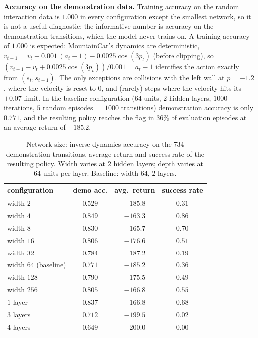 \documentclass[12pt]{article}%
\begin{document}
\medskip
\noindent\textbf{Accuracy on the demonstration data.} Training accuracy on the random
interaction data is $1.000$ in every configuration except the smallest network, so it is not
a useful diagnostic; the informative number is accuracy on the demonstration transitions,
which the model never trains on. A training accuracy of $1.000$ is expected: MountainCar's
dynamics are deterministic, $v_{t+1} = v_t + 0.001\,(a_t - 1) - 0.0025\cos(3p_t)$ (before
clipping), so $(v_{t+1} - v_t + 0.0025\cos(3p_t))/0.001 = a_t - 1$ identifies the action
exactly from $(s_t, s_{t+1})$. The only exceptions are collisions with the left wall at
$p=-1.2$, where the velocity is reset to $0$, and (rarely) steps where the velocity hits its
$\pm 0.07$ limit. In the baseline configuration ($64$ units, $2$ hidden
layers, $1000$ iterations, $5$ random episodes $=1000$ transitions) demonstration accuracy
is only $0.771$, and the resulting policy reaches the flag in $36\%$ of evaluation episodes
at an average return of $-185.2$.

\begin{table}[h]
\centering
\small
\caption{Network size: inverse dynamics accuracy on the $734$ demonstration transitions,
average return and success rate of the resulting policy. Width varies at $2$ hidden layers;
depth varies at $64$ units per layer. Baseline: width $64$, $2$ layers.}
\label{tab:p7size}
\setlength{\tabcolsep}{6pt}
\begin{tabular}{@{}lccc@{}}
\toprule
\textbf{configuration} & \textbf{demo acc.} & \textbf{avg.\ return} & \textbf{success rate} \\
\midrule
width $2$   & $0.529$ & $-185.8$ & $0.31$ \\
width $4$   & $\mathbf{0.849}$ & $\mathbf{-163.3}$ & $\mathbf{0.86}$ \\
width $8$   & $0.830$ & $-165.7$ & $0.70$ \\
width $16$  & $0.806$ & $-176.6$ & $0.51$ \\
width $32$  & $0.784$ & $-187.2$ & $0.19$ \\
width $64$ (baseline) & $0.771$ & $-185.2$ & $0.36$ \\
width $128$ & $0.790$ & $-175.5$ & $0.49$ \\
width $256$ & $0.805$ & $-166.8$ & $0.55$ \\
\midrule
$1$ layer  & $0.837$ & $-166.8$ & $0.68$ \\
$3$ layers & $0.712$ & $-199.5$ & $0.02$ \\
$4$ layers & $0.649$ & $-200.0$ & $0.00$ \\
\bottomrule
\end{tabular}
\end{table}
\end{document}
